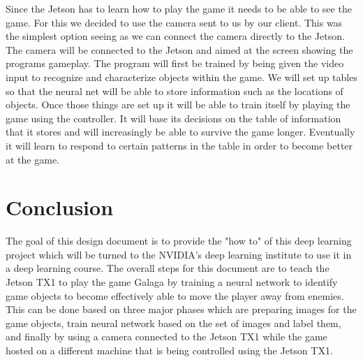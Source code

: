 \documentclass{scrreprt}
\begin{document}
Since the Jetson has to learn how to play the game it needs to be able to see the game.
For this we decided to use the camera sent to us by our client.
This was the simplest option seeing as we can connect the camera directly to the Jetson.
The camera will be connected to the Jetson and aimed at the screen showing the programs gameplay.
The program will first be trained by being given the video input to recognize and characterize objects within the game.
We will set up tables so that the neural net will be able to store information such as the locations of objects.
Once those things are set up it will be able to train itself by playing the game using the controller.
It will base its decisions on the table of information that it stores and will increasingly be able to survive the game longer.
Eventually it will learn to respond to certain patterns in the table in order to become better at the game.

\chapter{Conclusion}
The goal of this design document is to provide the "how to" of this deep learning project which will be turned to the NVIDIA's deep learning institute to use it in a deep learning course.
The overall steps for this document are to teach the Jetson TX1 to play the game Galaga by training a neural network to identify game objects to become effectively able to move the player away from enemies. 
This can be done based on three major phases which are preparing images for the game objects, train neural network based on the set of images and label them, and finally by using a camera connected to the Jetson TX1 while the game hosted on a different machine that is being controlled using the Jetson TX1.
\end{document}
